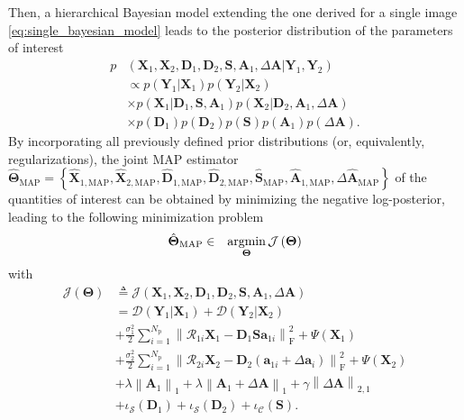 \documentclass[review]{elsarticle}
\newcommand{\Npatch}{N_{\mathrm{p}}}
\begin{document}
Then, a  hierarchical Bayesian model extending the one derived for a single image \eqref{eq:single_bayesian_model} leads to the posterior distribution of the parameters of interest
\begin{equation}
\begin{aligned}
\label{eq:coupled_bayesian_model}
p&\left(\mathbf{X}_{1},\mathbf{X}_{2},\mathbf{D}_{1},\mathbf{D}_{2},\mathbf{S},\mathbf{A}_{1},\Delta\mathbf{A}|\mathbf{Y}_{1},\mathbf{Y}_{2}\right)  \\ &\propto p(\mathbf{Y}_{1}|\mathbf{X}_{1}) p(\mathbf{Y}_{2}|\mathbf{X}_{2}) \\
&\times p(\mathbf{X}_{1}|\mathbf{D}_{1},\mathbf{S},\mathbf{A}_{1}) p(\mathbf{X}_{2}|\mathbf{D}_{2},\mathbf{A}_{1},\Delta\mathbf{A})\\
&\times p(\mathbf{D}_{1})p(\mathbf{D}_{2})p(\mathbf{S})p(\mathbf{A}_{1})p(\Delta\mathbf{A}).
\end{aligned}
\end{equation}
By incorporating all previously defined prior distributions (or, equivalently, regularizations), the joint MAP estimator $\hat{\boldsymbol{\Theta}}_{\text{MAP}} = \left\{\hat{\mathbf{X}}_{1,{\text{MAP}}},\hat{\mathbf{X}}_{2,{\text{MAP}}},\hat{\mathbf{D}}_{1,{\text{MAP}}},\hat{\mathbf{D}}_{2,{\text{MAP}}},\hat{\mathbf{S}}_{\text{MAP}},\hat{\mathbf{A}}_{1,{\text{MAP}}},\Delta\hat{\mathbf{A}}_{{\text{MAP}}}\right\}$ of the quantities of interest can be obtained by minimizing the negative log-posterior, leading to the following minimization problem
\begin{equation}
	\label{eq:map_coupled}
    \begin{aligned}
    &\hat{\boldsymbol{\Theta}}_{\text{MAP}} \in
    &\mathop{\rm argmin}\limits_{\boldsymbol{\Theta}}   \mathcal{J}\left(\boldsymbol{\Theta}\right)
    \end{aligned}
\end{equation}
with
\begin{equation}
\begin{aligned}
	\label{eq:objective_coupled_den}
  \mathcal{J}\left(\boldsymbol{\Theta}\right) &\triangleq  \mathcal{J}\left(\mathbf{X}_{1},\mathbf{X}_{2},\mathbf{D}_{1},\mathbf{D}_{2},\mathbf{S},\mathbf{A}_{1},\Delta\mathbf{A}\right) \\
  &=\mathcal{D}(\mathbf{Y}_{1}|\mathbf{X}_{1}) + \mathcal{D}(\mathbf{Y}_{2}|\mathbf{X}_{2}) \\
  &+\frac{\sigma_{1}^2}{2}\sum_{i=1}^{\Npatch}\left\|\mathcal{R}_{1{i}}\mathbf{X}_{1} - \mathbf{D}_{1}\mathbf{S}\mathbf{a}_{1{i}}\right\|_{\mathrm{F}}^{2} + \Psi\left(\mathbf{X}_{1}\right) \\
  &+  \frac{\sigma_{2}^2}{2}\sum_{i=1}^{\Npatch}\left\|\mathcal{R}_{2{i}}\mathbf{X}_{2} - \mathbf{D}_{2}\left(\mathbf{a}_{1{i}} + \Delta\mathbf{a}_{i}\right)\right\|_{\mathrm{F}}^{2}  + \Psi\left(\mathbf{X}_{2}\right)\\
  &+ \lambda \left\|\mathbf{A}_{1}\right\|_1 + \lambda \left\|\mathbf{A}_{1}+\Delta\mathbf{A}\right\|_1  + \gamma \left\|\Delta\mathbf{A}\right\|_{2,1}\\
 &+\iota_{\mathcal{S}}(\mathbf{D}_{1}) + \iota_{\mathcal{S}}(\mathbf{D}_{2}) + \iota_{\mathcal{C}}(\mathbf{S}).
\end{aligned}
\end{equation}
\end{document}
